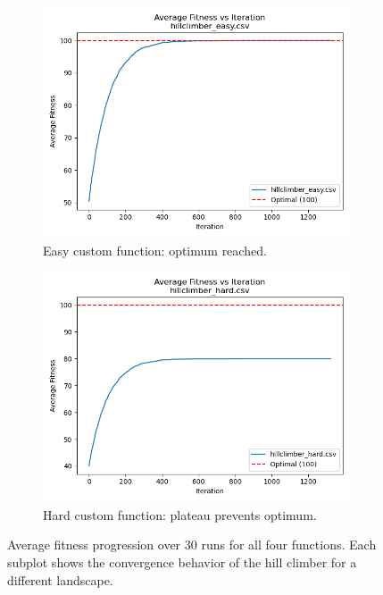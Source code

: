 \documentclass[11pt]{article}
\begin{document}
\begin{figure}[H]
    \vspace{0.5em}

    \begin{subfigure}[b]{0.45\textwidth}
        \centering
        \includegraphics[width=\textwidth]{hillclimber_easy.png}
        \caption{Easy custom function: optimum reached.}
        \label{fig:easy-plot}
    \end{subfigure}
    \hfill
    \begin{subfigure}[b]{0.45\textwidth}
        \centering
        \includegraphics[width=\textwidth]{hillclimber_hard.png}
        \caption{Hard custom function: plateau prevents optimum.}
        \label{fig:hard-plot}
    \end{subfigure}

    \caption{Average fitness progression over 30 runs for all four functions. Each subplot shows the convergence behavior of the hill climber for a different landscape.}
    \label{fig:all-functions}
\end{figure}
\end{document}
